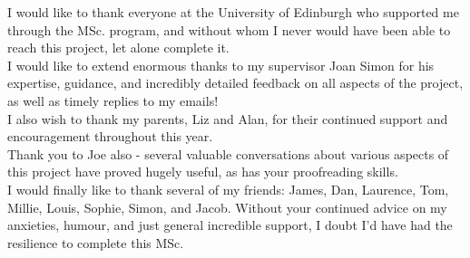 \documentclass[12pt,a4paper]{report}
\numberwithin{equation}{section}
\theoremstyle{definition}
\theoremstyle{theorem}
\theoremstyle{theorem}
\theoremstyle{example}
\theoremstyle{definition}
\begin{document}
I would like to thank everyone at the University of Edinburgh who supported me through the MSc. program, and without whom I never would have been able to reach this project, let alone complete it.\\
I would like to extend enormous thanks to my supervisor Joan Simon for his expertise, guidance, and incredibly detailed feedback on all aspects of the project, as well as timely replies to my emails!\\
I also wish to thank my parents, Liz and Alan, for their continued support and encouragement throughout this year.\\
Thank you to Joe also - several valuable conversations about various aspects of this project have proved hugely useful, as has your proofreading skills.\\
I would finally like to thank several of my friends: James, Dan, Laurence, Tom, Millie, Louis, Sophie, Simon, and Jacob. Without your continued advice on my anxieties, humour, and just general incredible support, I doubt I'd have had the resilience to complete this MSc. 

\tableofcontents

\end{document}

